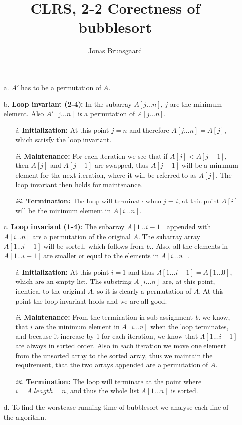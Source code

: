 \documentclass[11pt,a4paper]{article}
\title{CLRS, 2-2 Corectness of bubblesort}
\author{Jonas Brunsgaard}
\begin{document}
\maketitle

\begin{itemize}
    \item[a.] $A'$ has to be a permutation of $A$.
    \item[b.] \textbf{Loop invariant (2-4):} In the subarray  $A[j...n]$, $j$ are the minimum element. Also $A'[j...n]$ is a permutation of $A[j...n]$.
        \begin{itemize}
            \item[\textit{i.}] \textbf{Initialization:} At this point $j=n$ and therefore $A[j...n]=A[j]$, which satisfy the loop invariant.
            \item[\textit{ii.}] \textbf{Maintenance:} For each iteration we see that if $A[j] < A[j-1]$, then $A[j]$ and $A[j-1]$ 
                are swapped, thus $A[j-1]$ will be a minimum element for the next
                iteration, where it will be referred to as $A[j]$. The loop invariant then holds for maintenance.
            \item[\textit{iii.}] \textbf{Termination:} The loop will terminate when $j=i$, at this point $A[i]$ will be the minimum element in $A[i...n]$.
        \end{itemize}
    \item[c.] \textbf{Loop invariant (1-4):} The subarray $A[1...i-1]$ appended with $A[i...n]$ are a permutation of the original $A$. The subarray array 
        $A[1...i-1]$ will be sorted, which follows from \textit{b.}. Also, all the elements in $A[1...i-1]$ are smaller or equal to the elements in $A[i...n]$.
        \begin{itemize}
            \item[\textit{i.}]  \textbf{Initialization:} At this point $i=1$ and thus $A[1...i-1] = A[1...0]$, which are an empty list.  The substring $A[i...n]$ are, 
                    at this point, identical to the original $A$, so it is clearly a permutation of $A$. 
                    At this point the loop invariant holds and we are all good.
                \item[\textit{ii.}] \textbf{Maintenance:} From the termination in sub-assignment \textit{b.} we know, that $i$ are the minimum element in $A[i...n]$ when the
                    loop terminates, and because it increase by 1 for each iteration, we know that $A[1...i-1]$ are always in sorted order. 
                    Also in each iteration we move one element from the unsorted
                    array to the sorted array, thus we maintain the requirement, that the two arrays appended are a permutation of $A$.
            \item[\textit{iii.}]\textbf{Termination:} The loop will terminate at the point where $i=A.length=n$, and thus the whole 
                list $A[1...n]$ is sorted.
        \end{itemize}
    \item[d.] To find the worstcase running time of bubblesort we analyse each line of the algorithm.
        

\end{itemize}
\end{document}

